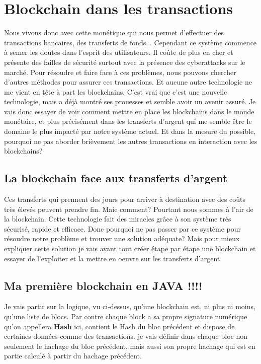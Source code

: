 \documentclass[12pt]{report}
\begin{document}
\newpage
\section{Blockchain dans les transactions}

\hspace{1cm} Nous vivons donc avec cette monétique qui nous permet d'effectuer des transactions bancaires, des transferts de fonds... Cependant ce système commence à semer les doutes dans l'esprit des utilisateurs. Il coûte de plus en cher et présente des failles de sécurité surtout avec la présence des cyberattacks sur le marché. Pour résoudre et faire face à ces problèmes, nous pouvons chercher d'autres méthodes pour assurer ces transactions. Et aucune autre technologie ne me vient en tête à part les blockchains. C'est vrai que c'est une nouvelle technologie, mais a déjà montré ses prouesses et semble avoir un avenir assuré. Je vais donc essayer de voir comment mettre en place les blockchains dans le monde monétaire, et plus précisément dans les transferts d'argent qui me semble être le domaine le plus impacté par notre système actuel. Et dans la mesure du possible, pourquoi ne pas aborder brièvement les autres transactions en interaction avec les blockchains? 


    \subsection{La blockchain face aux transferts d'argent}

\hspace{1cm}Ces transferts qui prennent des jours pour arriver à destination avec des coûts très élevés peuvent prendre fin. Maie comment? Pourtant nous sommes à l'air de la blockchain. Cette technologie fait des miracles grâce à son système très sécurisé, rapide et efficace. Donc pourquoi ne pas passer par ce système pour résoudre notre problème et trouver une solution adéquate? Mais pour mieux expliquer cette solution je vais avant tout créer étape par étape une blockchain et essayer de l'exploiter et la mettre en oeuvre sur les transferts d'argent.

\subsection{Ma première blockchain en JAVA !!!!}

\hspace{1cm} Je vais partir sur la logique, vu ci-dessus, qu'une blockchain est, ni plus ni moins, qu'une liste de blocs. Par contre chaque block a sa propre signature numérique qu'on appellera \textbf{Hash} ici, contient le Hash du bloc précédent et dispose de certaines données comme des transactions. je vais définir dans chaque bloc non seulement le hachage du bloc précédent, mais aussi son propre hachage qui est en partie calculé à partir du hachage précédent.
\end{document}
